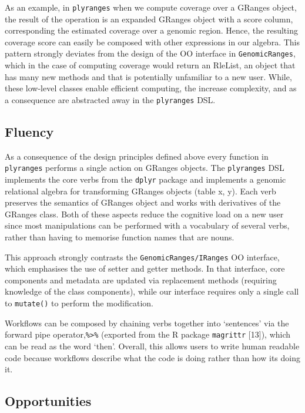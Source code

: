\documentclass[10pt,letterpaper]{article}
\begin{document}
As an example, in \texttt{plyranges} when we compute coverage over a
GRanges object, the result of the operation is an expanded GRanges
object with a score column, corresponding the estimated coverage over a
genomic region. Hence, the resulting coverage score can easily be
composed with other expressions in our algebra. This pattern strongly
deviates from the design of the OO interface in \texttt{GenomicRanges},
which in the case of computing coverage would return an RleList, an
object that has many new methods and that is potentially unfamiliar to a
new user. While, these low-level classes enable efficient computing, the
increase complexity, and as a consequence are abstracted away in the
\texttt{plyranges} DSL.

\hypertarget{fluency}{%
\subsection{Fluency}\label{fluency}}

As a consequence of the design principles defined above every function
in \texttt{plyranges} performs a single action on GRanges objects. The
\texttt{plyranges} DSL implements the core verbs from the \texttt{dplyr}
package and implements a genomic relational algebra for transforming
GRanges objects (table x, y). Each verb preserves the semantics of
GRanges object and works with derivatives of the GRanges class. Both of
these aspects reduce the cognitive load on a new user since most
manipulations can be performed with a vocabulary of several verbs,
rather than having to memorise function names that are nouns.

This approach strongly contrasts the \texttt{GenomicRanges/IRanges} OO
interface, which emphasises the use of setter and getter methods. In
that interface, core components and metadata are updated via replacement
methods (requiring knowledge of the class components), while our
interface requires only a single call to \texttt{mutate()} to perform
the modification.

Workflows can be composed by chaining verbs together into `sentences'
via the forward pipe operator,\texttt{\%\textgreater{}\%} (exported from
the R package \texttt{magrittr} {[}13{]}), which can be read as the word
`then'. Overall, this allows users to write human readable code because
workflows describe what the code is doing rather than how its doing it.

\hypertarget{opportunities}{%
\subsection{Opportunities}\label{opportunities}}
\end{document}
